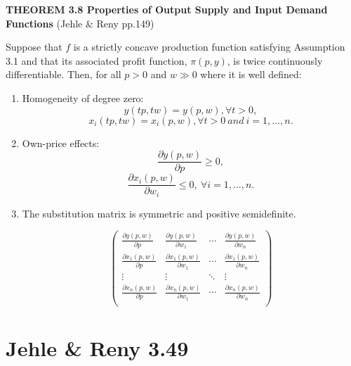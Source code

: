 \documentclass{article}
\begin{document}
\begin{mdframed}[backgroundcolor=blue!20,linecolor=white]

\textbf{THEOREM 3.8 Properties of Output Supply and Input Demand Functions} (Jehle \& Reny pp.149)

Suppose that $f$ is a strictly concave production function satisfying Assumption 3.1 and that its associated profit function, $\pi(p, y)$, is twice continuously differentiable. Then, for all $p > 0$ and $w \gg 0$ where it is well defined:

\begin{enumerate}

\item Homogeneity of degree zero:
$$y(tp,tw) = y (p,w), \forall t > 0,$$
$$x_i(tp,tw) = x_i(p,w), \forall t > 0 \ and \  i = 1,\dots, n.$$
\item Own-price effects:
$$\frac{\partial y(p,w)}{\partial p} \ge 0,$$
$$\frac{\partial x_i(p,w)}{\partial w_i} \le 0, \ \forall i = 1,\dots, n. $$

\item The substitution matrix is symmetric and positive semidefinite.

\begin{equation}
\left(
    \begin{array}{cccc}
    \frac{\partial y(p,w)}{\partial p} & \frac{\partial y(p,w)}{\partial w_1} & \cdots & \frac{\partial y(p,w)}{\partial w_n} \\
    \frac{\partial x_1(p,w)}{\partial p} & \frac{\partial x_1(p,w)}{\partial w_1} & \cdots & \frac{\partial x_1(p,w)}{\partial w_n} \\
    \vdots    &    \vdots & \ddots &   \vdots \\
    \frac{\partial x_n(p,w)}{\partial p} & \frac{\partial x_n(p,w)}{\partial w_1} & \cdots & \frac{\partial x_n(p,w)}{\partial w_n} \\
    \end{array}
    \right)
\label{eq:subst}   
\end{equation}


\end{enumerate}


\end{mdframed}


\section{Jehle \& Reny 3.49}
\end{document}
